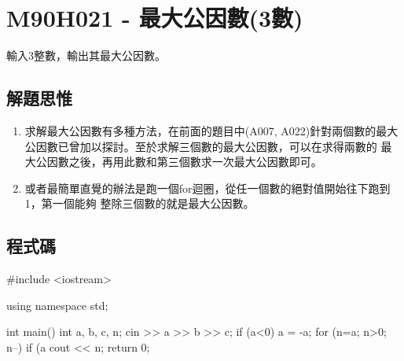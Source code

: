 \section{M90H021 - 最大公因數(3數)}
輸入3整數，輸出其最大公因數。
\subsection{解題思惟}
\begin{enumerate}
	\item 求解最大公因數有多種方法，在前面的題目中(A007, A022)針對兩個數的最大公因數已曾加以探討。至於求解三個數的最大公因數，可以在求得兩數的
	最大公因數之後，再用此數和第三個數求一次最大公因數即可。
	\item 或者最簡單直覺的辦法是跑一個for迴圈，從任一個數的絕對值開始往下跑到1，第一個能夠
	整除三個數的就是最大公因數。
\end{enumerate}
\subsection{程式碼}
\begin{cppcode}
#include <iostream>

using namespace std;

int main()
{
	int a, b, c, n;
	cin >> a >> b >> c;
	if (a<0) a = -a;
	for (n=a; n>0; n--) {
		if (a%
	}
	cout << n;
	return 0;
}
\end{cppcode}
